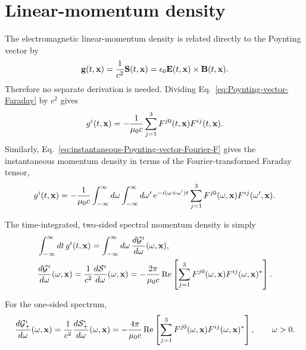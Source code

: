 \section{Linear-momentum density}

The electromagnetic linear-momentum density is related directly to the
Poynting vector by
\begin{align}
  {\bf g}(t,{\bf x})=\frac1{c^2}{\bf S}(t,{\bf x})
  =\epsilon_0{\bf E}(t,{\bf x})\times{\bf B}(t,{\bf x}).
  \label{eq:linear-momentum-density}
\end{align}
Therefore no separate derivation is needed.  Dividing
Eq.~\eqref{eq:Poynting-vector-Faraday} by $c^2$ gives
\begin{align}
  g^i(t,{\bf x})
  =-\frac1{\mu_0c}\sum_{j=1}^{3}
  F^{j0}(t,{\bf x})F^{ij}(t,{\bf x}).
  \label{eq:linear-momentum-density-Faraday}
\end{align}
Similarly, Eq.~\eqref{eq:instantaneous-Poynting-vector-Fourier-F} gives the
instantaneous momentum density in terms of the Fourier-transformed Faraday
tensor,
\begin{align}
  g^i(t,{\bf x})
  =-\frac1{\mu_0c}
  \int_{-\infty}^{\infty}d\omega
  \int_{-\infty}^{\infty}d\omega'\,
  e^{-i(\omega+\omega')t}
  \sum_{j=1}^{3}
  F^{j0}(\omega,{\bf x})F^{ij}(\omega',{\bf x}).
  \label{eq:instantaneous-linear-momentum-density-Fourier-F}
\end{align}

The time-integrated, two-sided spectral momentum density is simply
\begin{align}
  &\int_{-\infty}^{\infty}dt\,g^i(t,{\bf x})
  =\int_{-\infty}^{\infty}d\omega\,
  \frac{d\mathcal G^i}{d\omega}(\omega,{\bf x}),\\
  &\frac{d\mathcal G^i}{d\omega}(\omega,{\bf x})
  =\frac1{c^2}\frac{d\mathcal S^i}{d\omega}(\omega,{\bf x})
  =-\frac{2\pi}{\mu_0c}\operatorname{Re}
  \left[
    \sum_{j=1}^{3}F^{j0}(\omega,{\bf x})
    F^{ij}(\omega,{\bf x})^*
  \right].
  \label{eq:two-sided-spectral-linear-momentum-density-F}
\end{align}
\begin{highlightbox}[title={One-sided spectral linear-momentum density}]
  For the one-sided spectrum,
  \begin{align}
    \frac{d\mathcal G^i_+}{d\omega}(\omega,{\bf x})
    =\frac1{c^2}\frac{d\mathcal S^i_+}{d\omega}(\omega,{\bf x})
    =-\frac{4\pi}{\mu_0c}\operatorname{Re}
    \left[
      \sum_{j=1}^{3}F^{j0}(\omega,{\bf x})
      F^{ij}(\omega,{\bf x})^*
    \right],\qquad \omega>0.
    \label{eq:one-sided-spectral-linear-momentum-density-F}
  \end{align}

\end{highlightbox}
